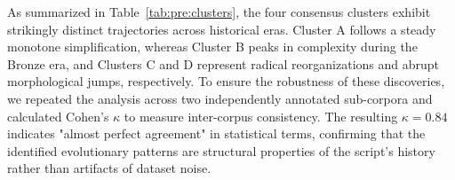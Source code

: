 \documentclass{article}
\begin{document}
\begin{table}[h]
  \centering
  \caption{Data-driven evolution pattern clusters. Trend symbols: $\downarrow\downarrow$ = monotone decrease, $\uparrow\uparrow$ = monotone increase, $\nearrow\searrow$ = increase then decrease, $\bullet$ = abrupt single-era change.}
  \label{tab:pre:clusters}
\end{table}

As summarized in Table~\ref{tab:pre:clusters}, the four consensus clusters exhibit strikingly distinct trajectories across historical eras. Cluster A follows a steady monotone simplification, whereas Cluster B peaks in complexity during the Bronze era, and Clusters C and D represent radical reorganizations and abrupt morphological jumps, respectively. To ensure the robustness of these discoveries, we repeated the analysis across two independently annotated sub-corpora and calculated Cohen's $\kappa$ to measure inter-corpus consistency. The resulting $\kappa = 0.84$ indicates "almost perfect agreement" in statistical terms, confirming that the identified evolutionary patterns are structural properties of the script's history rather than artifacts of dataset noise.
\end{document}
